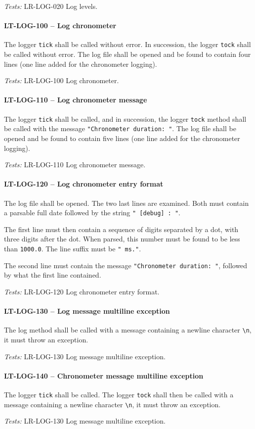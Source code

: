 \textit{Tests: } LR-LOG-020 Log levels.

\paragraph{LT-LOG-100 -- Log chronometer}
The logger \lstinline{tick} shall be called without error.
In succession, the logger \lstinline{tock} shall be called without error.
The log file shall be opened and be found to contain four lines
(one line added for the chronometer logging).

\textit{Tests: } LR-LOG-100 Log chronometer.

\paragraph{LT-LOG-110 -- Log chronometer message}
The logger \lstinline{tick} shall be called,
and in succession, the logger \lstinline{tock} method shall
be called with the message \lstinline{"Chronometer duration: "}.
The log file shall be opened and be found to contain five lines
(one line added for the chronometer logging).

\textit{Tests: } LR-LOG-110 Log chronometer message.

\paragraph{LT-LOG-120 -- Log chronometer entry format}
The log file shall be opened. The two last lines are examined.
Both must contain a parsable full date followed by
the string \lstinline{" [debug] : "}.

The first line must then contain a sequence of digits separated
by a dot, with three digits after the dot. When parsed, this number
must be found to be less than \lstinline{1000.0}. The line suffix
must be \lstinline{" ms."}.

The second line must contain the message
\lstinline{"Chronometer duration: "}, followed by what the first line
contained.

\textit{Tests: } LR-LOG-120 Log chronometer entry format.

\paragraph{LT-LOG-130 -- Log message multiline exception}
The log method shall be called with a message containing
a newline character \lstinline{\n}, it must throw an exception.

\textit{Tests: } LR-LOG-130 Log message multiline exception.

\paragraph{LT-LOG-140 -- Chronometer message multiline exception}
The logger \lstinline{tick} shall be called.
The logger \lstinline{tock} shall then be called with a message
containing a newline character \lstinline{\n}, it must throw
an exception.

\textit{Tests: } LR-LOG-130 Log message multiline exception.
